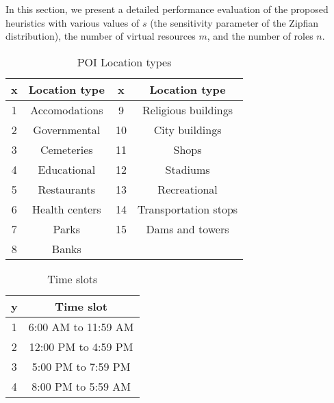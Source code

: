 In this section, we present a detailed performance evaluation of the proposed heuristics with various values of $s$ (the sensitivity parameter of the Zipfian distribution), the number of virtual resources $m$, and the number of roles $n$. %

 \begin{table}[t!]
      \centering
       \begin{tabular}{| c | c | c | c |}
        \hline 
            x & Location type & x & Location type \\ \hline \hline
            1 & Accomodations & 9 &  Religious buildings\\ \hline
            2 & Governmental & 10 & City buildings  \\ \hline
            3 & Cemeteries & 11 & Shops  \\ \hline
            4 & Educational & 12 & Stadiums  \\ \hline
            5 & Restaurants & 13 & Recreational \\ \hline
            6 & Health centers & 14 & Transportation stops \\ \hline
            7 & Parks & 15 & Dams and towers \\ \hline
            8 & Banks  &&\\
            \hline
        \end{tabular}
        \caption{POI Location types}
        \label{tab:loc}
\end{table}
\begin{table}[t!]
      \centering
       \begin{tabular}{|c| c|}
        \hline
            y & Time slot \\ \hline \hline
            1 & 6:00 AM to 11:59 AM \\ \hline
            2 & 12:00 PM to 4:59 PM \\ \hline
            3 & 5:00 PM to 7:59 PM \\\hline
            4 & 8:00 PM to 5:59 AM\\\hline
        \end{tabular}
        \caption{Time slots}
        \label{tab:time}
\end{table}

